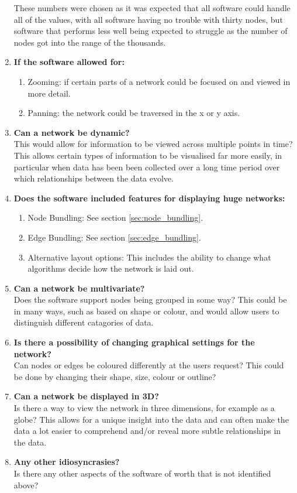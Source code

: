 \documentclass[../dissertation.tex]{subfiles}
\begin{document}
\begin{enumerate}
	These numbers were chosen as it was expected that all software could handle all of the values, with all software having no trouble with thirty nodes, but software that performs less well being expected to struggle as the number of nodes got into the range of the thousands. 
	\item \textbf{If the software allowed for:}
	\begin{enumerate}
		\item Zooming: if certain parts of a network could be focused on and viewed in more detail.
		\item Panning: the network could be traversed in the x or y axis.
	\end{enumerate}
	\item \textbf{Can a network be dynamic?}\\
	This would allow for information to be viewed across multiple points in time? This allows certain types of information to be visualised far more easily, in particular when data has been been collected over a long time period over which relationships between the data evolve.
	\item \textbf{Does the software included features for displaying huge networks:}
	\begin{enumerate} 
		\item Node Bundling: See section \ref{sec:node_bundling}.
		\item Edge Bundling: See section \ref{sec:edge_bundling}.
		\item Alternative layout options: This includes the ability to change what algorithms decide how the network is laid out.
	\end{enumerate}
	\item \textbf{Can a network be multivariate?}\\
	Does the software support nodes being grouped in some way? This could be in many ways, such as based on shape or colour, and would allow users to distinguish different catagories of data.
	\item \textbf{Is there a possibility of changing graphical settings for the network?}\\
	Can nodes or edges be coloured differently at the users request? This could be done by changing their shape, size, colour or outline?
	\item \textbf{Can a network be displayed in 3D?}\\
	Is there a way to view the network in three dimensions, for example as a globe? This allows for a unique insight into the data and can often make the data a lot easier to comprehend and/or reveal more subtle relationships in the data.
	\item \textbf{Any other idiosyncrasies?}\\
	Is there any other aspects of the software of worth that is not identified above?
\end{enumerate}
\end{document}
